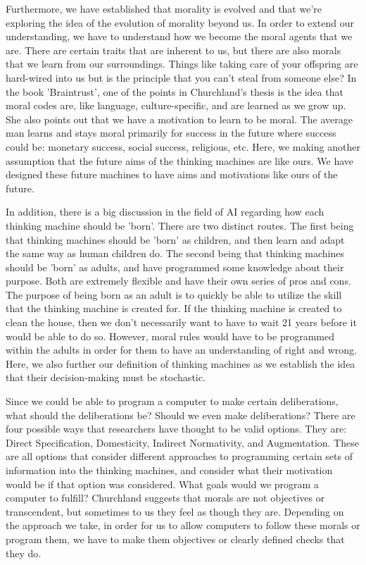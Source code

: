 \documentclass[11pt, oneside]{article}
\begin{document}
\par Furthermore, we have established that morality is evolved and that we're exploring the idea of the evolution of morality beyond us. In order to extend our understanding, we have to understand how we become the moral agents that we are. There are certain traits that are inherent to us, but there are also morals that we learn from our surroundings. Things like taking care of your offspring are hard-wired into us but is the principle that you can't steal from someone else? In the book 'Braintrust', one of the points in Churchland's thesis is the idea that moral codes are, like language, culture-specific, and are learned as we grow up. She also points out that we have a motivation to learn to be moral. The average man learns and stays moral primarily for success in the future where success could be: monetary success, social success, religious, etc. Here, we making another assumption that the future aims of the thinking machines are like ours. We have designed these future machines to have aims and motivations like ours of the future.
 
\par In addition, there is a big discussion in the field of AI regarding how each thinking machine should be 'born'. There are two distinct routes. The first being that thinking machines should be 'born' as children, and then learn and adapt the same way as human children do. The second being that thinking machines should be 'born' as adults, and have programmed some knowledge about their purpose. Both are extremely flexible and have their own series of pros and cons. The purpose of being born as an adult is to quickly be able to utilize the skill that the thinking machine is created for. If the thinking machine is created to clean the house, then we don't necessarily want to have to wait 21 years before it would be able to do so.
However, moral rules would have to be programmed within the adults in order for them to have an understanding of right and wrong. Here, we also further our definition of thinking machines as we establish the idea that their decision-making must be stochastic.
 
\par Since we could be able to program a computer to make certain deliberations, what should the deliberations be? Should we even make deliberations? There are four possible ways that researchers have thought to be valid options. They are: Direct Specification, Domesticity, Indirect Normativity, and Augmentation. These are all options that consider different approaches to programming certain sets of information into the thinking machines, and consider what their motivation would be if that option was considered. What goals would we program a computer to fulfill? Churchland suggests that morals are not objectives or transcendent, but sometimes to us they feel as though they are. Depending on the approach we take, in order for us to allow computers to follow these morals or program them, we have to make them objectives or clearly defined checks that they do.
 
\end{document}
